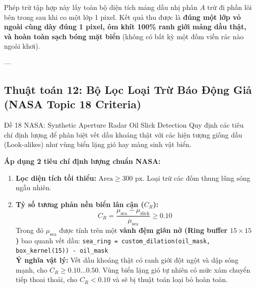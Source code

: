 \documentclass[11pt,a4paper]{article}
\begin{document}
\begin{whyuse}
Phép trừ tập hợp này lấy toàn bộ diện tích mảng dầu nhị phân $A$ trừ đi phần lõi bên trong sau khi co một lớp 1 pixel. Kết quả thu được là \textbf{đúng một lớp vỏ ngoài cùng dày đúng 1 pixel, ôm khít 100\% ranh giới mảng dầu thật, và hoàn toàn sạch bóng mặt biển} (không có bất kỳ một đốm viền rác nào ngoài khơi).
\end{whyuse}

---

\subsection{Thuật toán 12: Bộ Lọc Loại Trừ Báo Động Giả (NASA Topic 18 Criteria)}
\begin{slidemapping}{Đề 18 NASA: Synthetic Aperture Radar Oil Slick Detection}
Quy định các tiêu chí định lượng để phân biệt vết dầu khoáng thật với các hiện tượng giống dầu (Look-alikes) như vùng biển lặng gió hay màng sinh vật biển.
\end{slidemapping}

\begin{whyuse}
\textbf{Áp dụng 2 tiêu chí định lượng chuẩn NASA:}
\begin{enumerate}
    \item \textbf{Lọc diện tích tối thiểu:} $\text{Area} \ge 300\text{ px}$. Loại trừ các đốm thung lũng sóng ngẫu nhiên.
    \item \textbf{Tỷ số tương phản nền biển lân cận ($C_R$):}
    \begin{equation}
    C_R = \frac{\mu_{\text{sea}} - \mu_{\text{slick}}}{\mu_{\text{sea}}} \ge 0.10
    \end{equation}
    Trong đó $\mu_{\text{sea}}$ được tính trên một \textbf{vành đệm giãn nở (Ring buffer $15 \times 15$)} bao quanh vết dầu:
    \lstinline|sea_ring = custom_dilation(oil_mask, box_kernel(15)) - oil_mask|\\
    \textbf{Ý nghĩa vật lý:} Vết dầu khoáng thật có ranh giới đột ngột và dập sóng mạnh, cho $C_R \ge 0.10 \dots 0.50$. Vùng biển lặng gió tự nhiên có mức xám chuyển tiếp thoai thoải, cho $C_R < 0.10$ và sẽ bị thuật toán loại bỏ hoàn toàn.
\end{enumerate}
\end{whyuse}

\newpage

\end{document}
